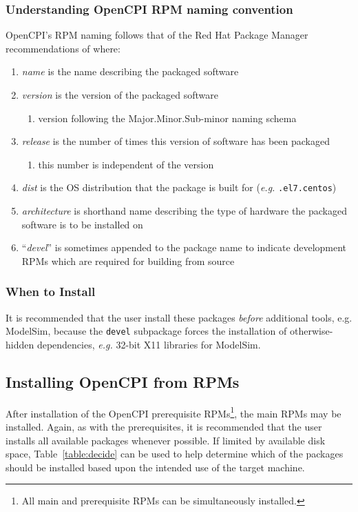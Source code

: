 \subsubsection*{Understanding OpenCPI RPM naming convention}
\label{sec:understand_rpm_naming}
OpenCPI's RPM naming follows that of the Red Hat Package Manager recommendations of  where:

\begin{enumerate}
	\setcounter{enumi}{0} %
 	\item \textit{name} is the name describing the packaged software
 	\item \textit{version} is the version of the packaged software
 	\begin{enumerate}
	 	\item version following the Major.Minor.Sub-minor naming schema
	\end{enumerate}
 	\item \textit{release} is the number of times this version of software has been packaged
	\begin{enumerate}
	 	\item{this number is independent of the version}
	 \end{enumerate}
 	\item \textit{dist} is the OS distribution that the package is built for (\textit{e.g.} \texttt{.el7.centos})
 	\item \textit{architecture} is shorthand name describing the type of hardware the packaged software is to be installed on
 	\item ``\textit{devel}'' is sometimes appended to the package name to indicate development RPMs which are required for building from source
\end{enumerate}

\subsubsection*{When to Install}
It is recommended that the user install these packages \textit{before} additional tools, e.g. ModelSim, because the \texttt{devel} subpackage forces the installation of otherwise-hidden dependencies, \textit{e.g.} 32-bit X11 libraries for ModelSim.

\subsection{Installing OpenCPI from RPMs}
\label{sec:install_av_rpm}
After installation of the OpenCPI prerequisite RPMs\footnote{All main and prerequisite RPMs can be simultaneously installed.}, the main RPMs may be installed. Again, as with the prerequisites, it is recommended that the user installs all available packages whenever possible. If limited by available disk space, Table~\ref{table:decide} can be used to help determine which of the packages should be installed based upon the intended use of the target machine.\\

